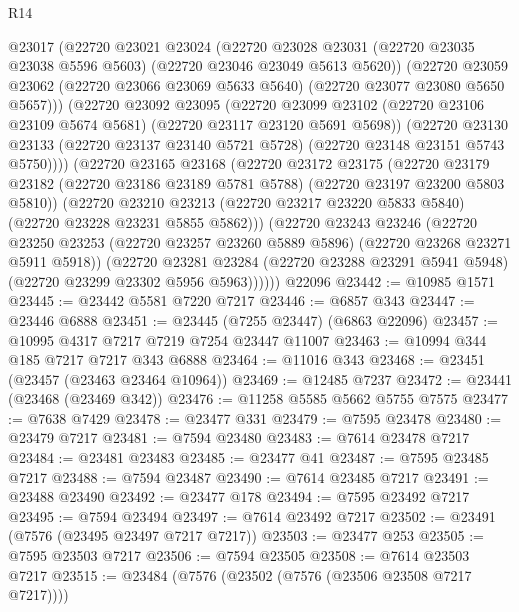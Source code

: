 \begin{lexlean}{R14}
\begin{coremodule}
          @23017
          (@22720
            @23021
            @23024
            (@22720
              @23028
              @23031
              (@22720 @23035 @23038 @5596 @5603)
              (@22720 @23046 @23049 @5613 @5620))
            (@22720
              @23059
              @23062
              (@22720 @23066 @23069 @5633 @5640)
              (@22720 @23077 @23080 @5650 @5657)))
          (@22720
            @23092
            @23095
            (@22720
              @23099
              @23102
              (@22720 @23106 @23109 @5674 @5681)
              (@22720 @23117 @23120 @5691 @5698))
            (@22720
              @23130
              @23133
              (@22720 @23137 @23140 @5721 @5728)
              (@22720 @23148 @23151 @5743 @5750))))
        (@22720
          @23165
          @23168
          (@22720
            @23172
            @23175
            (@22720
              @23179
              @23182
              (@22720 @23186 @23189 @5781 @5788)
              (@22720 @23197 @23200 @5803 @5810))
            (@22720
              @23210
              @23213
              (@22720 @23217 @23220 @5833 @5840)
              (@22720 @23228 @23231 @5855 @5862)))
          (@22720
            @23243
            @23246
            (@22720
              @23250
              @23253
              (@22720 @23257 @23260 @5889 @5896)
              (@22720 @23268 @23271 @5911 @5918))
            (@22720
              @23281
              @23284
              (@22720 @23288 @23291 @5941 @5948)
              (@22720 @23299 @23302 @5956 @5963))))))
    @22096
@23442 := @10985 @1571
@23445 := @23442 @5581 @7220 @7217
@23446 := @6857 @343
@23447 := @23446 @6888
@23451 := @23445 (@7255 @23447) (@6863 @22096)
@23457 := @10995 @4317 @7217 @7219 @7254 @23447 @11007
@23463 := @10994 @344 @185 @7217 @7217 @343 @6888
@23464 := @11016 @343
@23468 := @23451 (@23457 (@23463 @23464 @10964))
@23469 := @12485 @7237
@23472 := @23441 (@23468 (@23469 @342))
@23476 := @11258 @5585 @5662 @5755 @7575
@23477 := @7638 @7429
@23478 := @23477 @331
@23479 := @7595 @23478
@23480 := @23479 @7217
@23481 := @7594 @23480
@23483 := @7614 @23478 @7217
@23484 := @23481 @23483
@23485 := @23477 @41
@23487 := @7595 @23485 @7217
@23488 := @7594 @23487
@23490 := @7614 @23485 @7217
@23491 := @23488 @23490
@23492 := @23477 @178
@23494 := @7595 @23492 @7217
@23495 := @7594 @23494
@23497 := @7614 @23492 @7217
@23502 := @23491 (@7576 (@23495 @23497 @7217 @7217))
@23503 := @23477 @253
@23505 := @7595 @23503 @7217
@23506 := @7594 @23505
@23508 := @7614 @23503 @7217
@23515 := @23484 (@7576 (@23502 (@7576 (@23506 @23508 @7217 @7217))))

\end{coremodule}
\end{lexlean}
